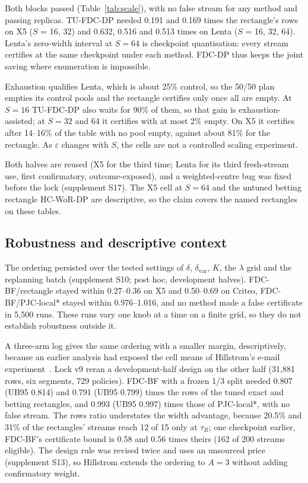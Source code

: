 \documentclass[sigconf,anonymous,review]{acmart}
\newcommand{\eps}{\varepsilon}
\newcommand{\dvar}{\delta_{\text{var}}}
\begin{document}
Both blocks passed (Table~\ref{tab:scale}), with no false stream for any method and passing replicas. TU-FDC-DP needed 0.191 and 0.169 times the rectangle's rows on X5 ($S$ = 16, 32) and 0.632, 0.516 and 0.513 times on Lenta ($S$ = 16, 32, 64). Lenta's zero-width interval at $S = 64$ is checkpoint quantisation: every stream certifies at the same checkpoint under each method. FDC-DP thus keeps the joint saving where enumeration is impossible.

Exhaustion qualifies Lenta, which is about 25\% control, so the 50/50 plan empties its control pools and the rectangle certifies only once all are empty. At $S = 16$ TU-FDC-DP also waits for 90\% of them, so that gain is exhaustion-assisted; at $S = 32$ and 64 it certifies with at most 2\% empty. On X5 it certifies after 14--16\% of the table with no pool empty, against about 81\% for the rectangle. As $\eps$ changes with $S$, the cells are not a controlled scaling experiment.

Both halves are reused (X5 for the third time; Lenta for its third fresh-stream use, first confirmatory, outcome-exposed), and a weighted-centre bug was fixed before the lock (supplement S17). The X5 cell at $S = 64$ and the untuned betting rectangle HC-WoR-DP are descriptive, so the claim covers the named rectangles on these tables.

\subsection{Robustness and descriptive context}\label{sec:external}

The ordering persisted over the tested settings of $\delta$, $\dvar$, $K$, the $\lambda$ grid and the replanning batch (supplement S10; post hoc, development halves). FDC-BF/rectangle stayed within 0.27--0.36 on X5 and 0.50--0.69 on Criteo, FDC-BF/PJC-local* stayed within 0.976--1.016, and no method made a false certificate in 5,500 runs. These runs vary one knob at a time on a finite grid, so they do not establish robustness outside it.

A three-arm log gives the same ordering with a smaller margin, descriptively, because an earlier analysis had exposed the cell means of Hillstrom's e-mail experiment~\citep{hillstrom2008minethatdata}. Lock v9 reran a development-half design on the other half (31,881 rows, six segments, 729 policies). FDC-BF with a frozen 1/3 split needed 0.807 (UB95 0.814) and 0.791 (UB95 0.799) times the rows of the tuned exact and betting rectangles, and 0.993 (UB95 0.997) times those of PJC-local*, with no false stream. The rows ratio understates the width advantage, because 20.5\% and 31\% of the rectangles' streams reach 12 of 15 only at $\tau_R$; one checkpoint earlier, FDC-BF's certificate bound is 0.58 and 0.56 times theirs (162 of 200 streams eligible). The design rule was revised twice and uses an unsourced price (supplement S13), so Hillstrom extends the ordering to $A = 3$ without adding confirmatory weight.
\end{document}
